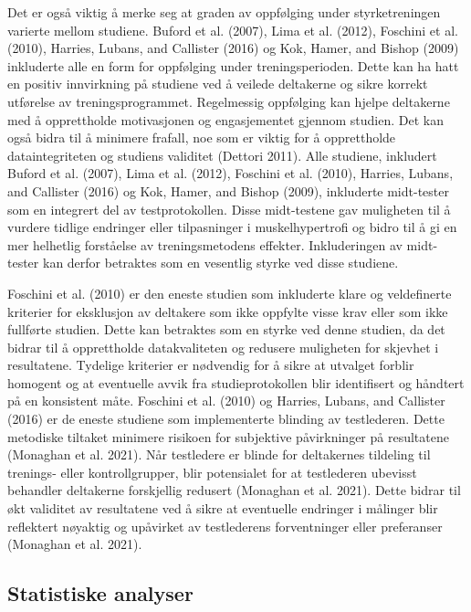 \documentclass[
  letterpaper,
  DIV=11,
  numbers=noendperiod]{scrreprt}
\begin{document}
Det er også viktig å merke seg at graden av oppfølging under
styrketreningen varierte mellom studiene. Buford et al. (2007), Lima et
al. (2012), Foschini et al. (2010), Harries, Lubans, and Callister
(2016) og Kok, Hamer, and Bishop (2009) inkluderte alle en form for
oppfølging under treningsperioden. Dette kan ha hatt en positiv
innvirkning på studiene ved å veilede deltakerne og sikre korrekt
utførelse av treningsprogrammet. Regelmessig oppfølging kan hjelpe
deltakerne med å opprettholde motivasjonen og engasjementet gjennom
studien. Det kan også bidra til å minimere frafall, noe som er viktig
for å opprettholde dataintegriteten og studiens validitet (Dettori
2011). Alle studiene, inkludert Buford et al. (2007), Lima et al.
(2012), Foschini et al. (2010), Harries, Lubans, and Callister (2016) og
Kok, Hamer, and Bishop (2009), inkluderte midt-tester som en integrert
del av testprotokollen. Disse midt-testene gav muligheten til å vurdere
tidlige endringer eller tilpasninger i muskelhypertrofi og bidro til å
gi en mer helhetlig forståelse av treningsmetodens effekter.
Inkluderingen av midt-tester kan derfor betraktes som en vesentlig
styrke ved disse studiene.

Foschini et al. (2010) er den eneste studien som inkluderte klare og
veldefinerte kriterier for eksklusjon av deltakere som ikke oppfylte
visse krav eller som ikke fullførte studien. Dette kan betraktes som en
styrke ved denne studien, da det bidrar til å opprettholde
datakvaliteten og redusere muligheten for skjevhet i resultatene.
Tydelige kriterier er nødvendig for å sikre at utvalget forblir homogent
og at eventuelle avvik fra studieprotokollen blir identifisert og
håndtert på en konsistent måte. Foschini et al. (2010) og Harries,
Lubans, and Callister (2016) er de eneste studiene som implementerte
blinding av testlederen. Dette metodiske tiltaket minimere risikoen for
subjektive påvirkninger på resultatene (Monaghan et al. 2021). Når
testledere er blinde for deltakernes tildeling til trenings- eller
kontrollgrupper, blir potensialet for at testlederen ubevisst behandler
deltakerne forskjellig redusert (Monaghan et al. 2021). Dette bidrar til
økt validitet av resultatene ved å sikre at eventuelle endringer i
målinger blir reflektert nøyaktig og upåvirket av testlederens
forventninger eller preferanser (Monaghan et al. 2021).

\hypertarget{statistiske-analyser-1}{%
\subsection{Statistiske analyser}\label{statistiske-analyser-1}}
\end{document}
